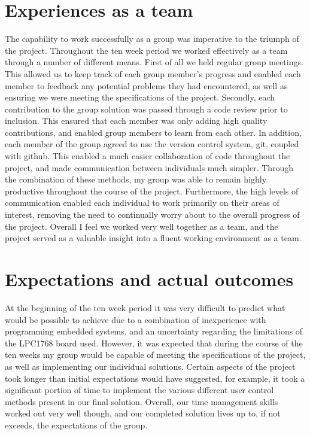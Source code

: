 \section{Experiences as a team}
The capability to work successfully as a group was imperative to the triumph of
the project. 
Throughout the ten week period we worked effectively as a team through a number 
of different means. 
First of all we held regular group meetings. This allowed us to keep track of 
each group member's progress and enabled each member to feedback any potential 
problems they had encountered, as well as ensuring we were meeting the 
specifications of the project. 
Secondly, each contribution to the group solution was passed through a code 
review prior to inclusion. 
This ensured that each member was only adding high 
quality contributions, and enabled group members to learn from each other.
In addition, each member of the group agreed to use the version control system, 
git, coupled with github. This enabled a much easier collaboration of code 
throughout the project, and made communication between individuals much simpler. 
Through the combination of these methods, my group was able to remain highly 
productive throughout the course of the project.
Furthermore, the high levels of communication enabled each individual to work 
primarily on their areas of interest, removing the need to continually worry 
about to the overall progress of the project. 
Overall I feel we worked very well together as a team, and the project served 
as a valuable insight into a fluent working environment as a team. 

\section{Expectations and actual outcomes}
At the beginning of the ten week period it was very difficult to predict what 
would be possible to achieve due to a combination of  inexperience with 
programming embedded systems, and an uncertainty regarding the limitations 
of the LPC1768 board used. 
However, it was expected that during the 
course of the ten weeks my group would be capable of meeting the specifications
of the project, as well as implementing our individual solutions. 
Certain 
aspects of the project took longer than initial expectations would have 
suggested, for example, it took a significant portion of time to implement the 
various different user control methods present in our final solution. 
Overall, 
our time management skills worked out very well though, and our completed 
solution lives up to, if not exceeds, the expectations of the group. 

